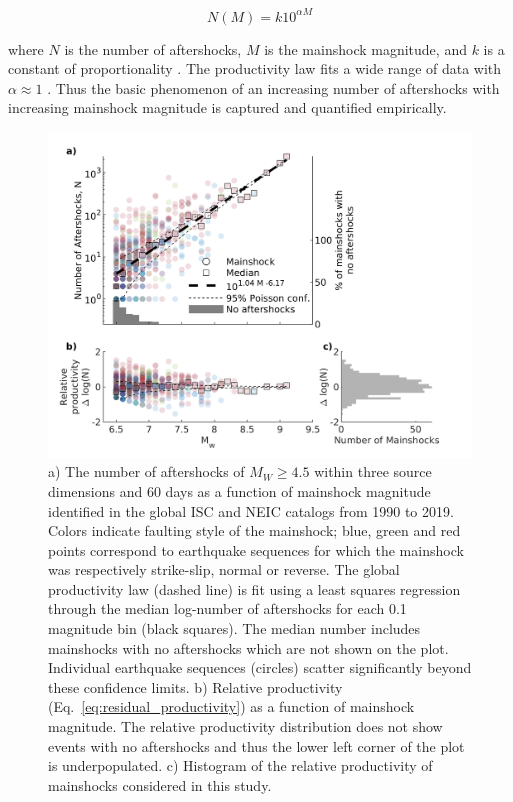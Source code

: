 \documentclass[draft, jgrga]{agujournal2018}
\begin{document}
\begin{linenomath*}
\begin{equation}\label{eq:productivity}
    N(M)=k10^{\alpha M}
\end{equation}
\end{linenomath*}
%
where $N$ is the number of aftershocks, $M$ is the mainshock magnitude, and $k$ is a constant of proportionality  \citep{Reasenberg1989}. The productivity law fits a wide range of data with $\alpha\approx1$ \citep{Reasenberg1989, Yamanaka1990scalingshock,  DeArcangelis2016, Kisslinger1996,Tahir2015,Tahir2014Aftershock2005, Page}. Thus the basic phenomenon of an increasing number of aftershocks with increasing mainshock magnitude is captured and quantified empirically.

    \begin{figure}
        \centering
        \includegraphics{figures/prod_law.png}
        \caption{a) The number of aftershocks of $M_W\ge4.5$ within three source dimensions and 60 days as a function of mainshock magnitude identified in the global ISC and NEIC catalogs from 1990 to 2019. Colors indicate faulting style of the mainshock; blue, green and red points correspond to earthquake sequences for which the mainshock was respectively strike-slip, normal or reverse. The global productivity law (dashed line) is fit using a least squares regression through the median log-number of aftershocks for each 0.1 magnitude bin (black squares). The median number includes mainshocks with no aftershocks which are not shown on the plot.  Individual earthquake sequences (circles) scatter significantly beyond these confidence limits. b) Relative productivity (Eq.~\ref{eq:residual_productivity}) as a function of mainshock magnitude. The relative productivity distribution does not show events with no aftershocks and thus the lower left corner of the plot is underpopulated. c) Histogram of the relative productivity of mainshocks considered in this study.
        }
        \label{fig:fms_prod}
    \end{figure}
\end{document}
